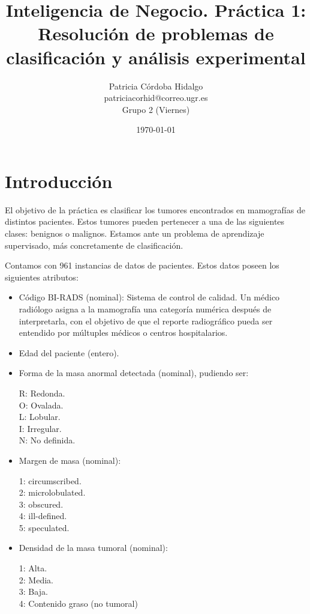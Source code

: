 \documentclass[a4]{article}
\title{\Huge Inteligencia de Negocio. Práctica 1:\\
Resolución de problemas de\\
clasificación y análisis experimental \vspace{5mm}}
\author{\LARGE Patricia Córdoba Hidalgo \vspace{2mm}\\
  \Large patriciacorhid@correo.ugr.es \vspace{2mm}\\
  \Large Grupo 2 (Viernes) \vspace{5mm}}
\date{\today}
\begin{document}
\maketitle

\newpage
\tableofcontents
\newpage

\section{Introducción}

El objetivo de la práctica es clasificar los tumores encontrados en mamografías de distintos pacientes. Estos tumores pueden pertenecer a una de las siguientes clases: benignos o malignos. Estamos ante un problema de aprendizaje supervisado, más concretamente de clasificación.

Contamos con 961 instancias de datos de pacientes. Estos datos poseen los siguientes atributos:
\begin{itemize}
\item Código BI-RADS (nominal): Sistema de control de calidad. Un médico radiólogo asigna a la mamografía una categoría numérica después de interpretarla, con el objetivo de que el reporte radiográfico pueda ser entendido por múltuples médicos o centros hospitalarios.

\item Edad del paciente (entero).

\item Forma de la masa anormal detectada (nominal), pudiendo ser:\\
  \vspace{-5mm}
  
  R: Redonda.\\
  O: Ovalada.\\
  L: Lobular.\\
  I: Irregular.\\
  N: No definida.\\

   \vspace{-5mm}
\item Margen de masa (nominal):\\
  \vspace{-5mm}

  1: circumscribed.\\
  2: microlobulated.\\
  3: obscured.\\
  4: ill-defined.\\
  5: speculated.\\

   \vspace{-5mm}
\item Densidad de la masa tumoral (nominal):\\
  \vspace{-5mm}

  1: Alta.\\
  2: Media.\\
  3: Baja.\\
  4: Contenido graso (no tumoral)\\
  
\end{itemize}
\end{document}
